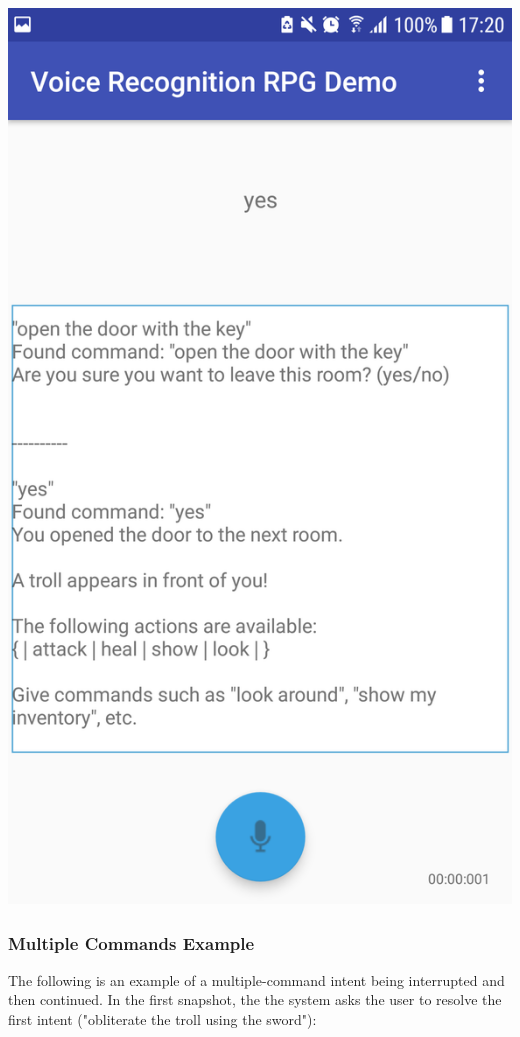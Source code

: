 \documentclass[11pt]{article}
\begin{document}
\begin{center}
\includegraphics[scale=0.18]{overworld-4.png}
\end{center}

\newpage
\subsubsection{Multiple Commands Example}
\label{appendix:multiple-commands-ex}
The following is an example of a multiple-command intent being interrupted and then continued. In the first snapshot, the the system asks the user to resolve the first intent ("obliterate the troll using the sword"):
\end{document}
